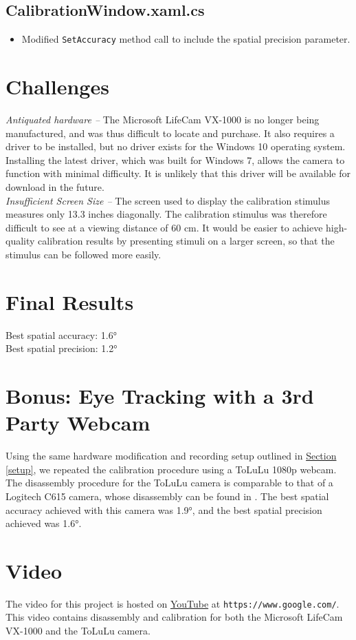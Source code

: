 \documentclass[11pt]{article}
\begin{document}
\subsection*{CalibrationWindow.xaml.cs}
    \begin{itemize}
        \item Modified \texttt{SetAccuracy} method call to include the spatial precision parameter.
    \end{itemize}

\section{Challenges} %
\textit{Antiquated hardware -- }The Microsoft LifeCam VX-1000 is no longer being manufactured, and was thus difficult to locate and purchase. It also requires a driver to be installed, but no driver exists for the Windows 10 operating system. Installing the latest driver, which was built for Windows 7, allows the camera to function with minimal difficulty. It is unlikely that this driver will be available for download in the future. \\
\textit{Insufficient Screen Size -- } The screen used to display the calibration stimulus measures only 13.3 inches diagonally. The calibration stimulus was therefore difficult to see at a viewing distance of 60 cm. It would be easier to achieve high-quality calibration results by presenting stimuli on a larger screen, so that the stimulus can be followed more easily.
\section{Final Results} %
Best spatial accuracy: \ang{1.6} \\
Best spatial precision: \ang{1.2}

\section{Bonus: Eye Tracking with a 3rd Party Webcam}
Using the same hardware modification and recording setup outlined in \hyperref[setup]{Section \ref{setup}}, we repeated the calibration procedure using a ToLuLu 1080p webcam. The disassembly procedure for the ToLuLu camera is comparable to that of a Logitech C615 camera, whose disassembly can be found in \cite{Burns}. The best spatial accuracy achieved with this camera was \ang{1.9}, and the best spatial precision achieved was \ang{1.6}.

\section{Video}
The video for this project is hosted on \href{https://www.google.com/}{YouTube} at \texttt{https://www.google.com/}. \\
This video contains disassembly and calibration for both the Microsoft LifeCam VX-1000 and the ToLuLu camera.

\end{document}
